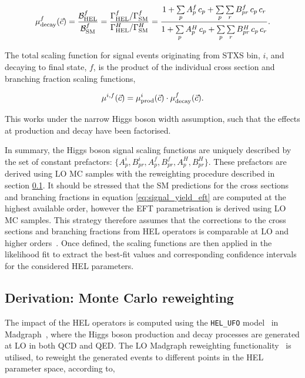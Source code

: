 \begin{equation}
    \mu^f_{\rm{decay}}(\vec{c}) = \frac{\mathcal{B}^f_{\rm{HEL}}}{\mathcal{B}^f_{\rm{SM}}} = \frac{\Gamma^f_{\rm{HEL}}/\Gamma^f_{\rm{SM}}}{\Gamma^H_{\rm{HEL}}/\Gamma^H_{\rm{SM}}} = \frac{1 + \sum\limits_p A^f_p\,c_p + \sum\limits_p \sum\limits_r B^f_{pr}\,c_p\,c_r}{1 + \sum\limits^{~}_p A^H_p\,c_p + \sum\limits_p \sum\limits_r B^H_{pr}\,c_p\,c_r}.
\end{equation}

The total scaling function for signal events originating from STXS bin, $i$, and decaying to final state, $f$, is the product of the individual cross section and branching fraction scaling functions,

\begin{equation}
    \mu^{i,f}(\vec{c}) = \mu^i_{\rm{prod}}(\vec{c}) \cdot \mu^f_{\rm{decay}}(\vec{c}).
\end{equation}

\noindent
This works under the narrow Higgs boson width assumption, such that the effects at production and decay have been factorised.

In summary, the Higgs boson signal scaling functions are uniquely described by the set of constant prefactors: $\{A^i_p,B^i_{pr},A^f_p,B^f_{pr},A^{H}_p,B^{H}_{pr}\}$. These prefactors are derived using LO MC samples with the reweighting procedure described in section \ref{sec:hel_derivation}. It should be stressed that the SM predictions for the cross sections and branching fractions in equation \ref{eq:signal_yield_eft} are computed at the highest available order, however the EFT parametrisation is derived using LO MC samples. This strategy therefore assumes that the corrections to the cross sections and branching fractions from HEL operators is comparable at LO and higher orders~\cite{Degrande:2016dqg}. Once defined, the scaling functions are then applied in the likelihood fit to extract the best-fit values and corresponding confidence intervals for the considered HEL parameters. 


\subsection{Derivation: Monte Carlo reweighting}\label{sec:hel_derivation}
The impact of the HEL operators is computed using the \texttt{HEL\_UFO} model~\cite{Alloul:2013naa} in Madgraph~\cite{Alwall:2014hca}, where the Higgs boson production and decay processes are generated at LO in both QCD and QED. The LO Madgraph reweighting functionality~\cite{Mattelaer:2016gcx} is utilised, to reweight the generated events to different points in the HEL parameter space, according to,

